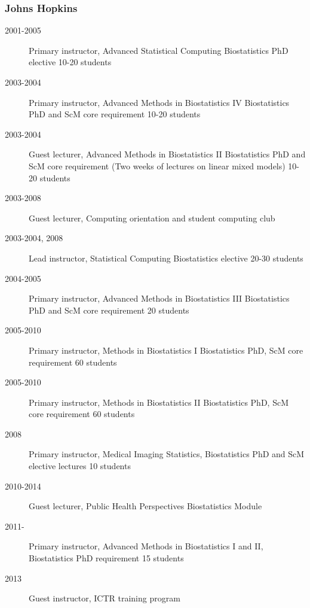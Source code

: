 \documentclass[12pt]{article}
\begin{document}
\subsubsection*{Johns Hopkins} 
\begin{description}
\item[\textnormal{2001-2005}] Primary instructor, Advanced Statistical Computing  Biostatistics PhD elective 10-20 students 
\item[\textnormal{2003-2004}] Primary instructor, Advanced Methods in Biostatistics IV Biostatistics PhD and ScM core requirement 10-20 students 
\item[\textnormal{2003-2004}] Guest lecturer, Advanced Methods in Biostatistics II
Biostatistics PhD and ScM core requirement (Two weeks of lectures on linear mixed models) 10-20 students 
\item[\textnormal{2003-2008}] Guest lecturer, Computing orientation and student computing club 
\item[\textnormal{2003-2004, 2008}] Lead instructor, Statistical Computing Biostatistics elective 20-30 students
\item[\textnormal{2004-2005}] Primary instructor, Advanced Methods in Biostatistics III 
Biostatistics PhD and ScM core requirement 20 students 
\item[\textnormal{2005-2010}] Primary instructor, Methods in Biostatistics  I 
Biostatistics PhD, ScM core requirement  60 students 
\item[\textnormal{2005-2010}] Primary instructor, Methods in Biostatistics II
  Biostatistics PhD, ScM core requirement 60 students
\item[\textnormal{2008}]  Primary instructor, Medical Imaging Statistics, Biostatistics PhD and ScM elective lectures 10 students 
\item[\textnormal{2010-2014}] Guest lecturer, Public Health Perspectives Biostatistics Module
\item[\textnormal{2011}-] Primary instructor, Advanced Methods in Biostatistics I and II,
Biostatistics PhD requirement 15 students
\item[\textnormal{2013}] Guest instructor, ICTR training program
\end{description}
\end{document}
